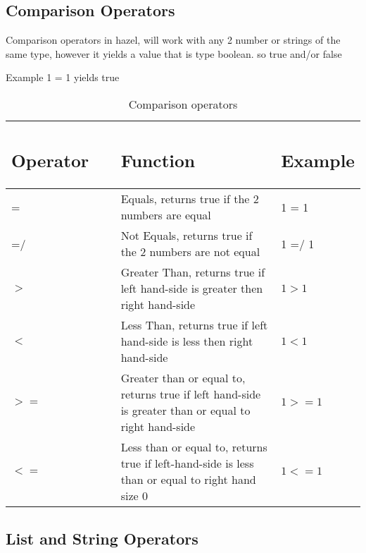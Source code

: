 \documentclass{article}
\begin{document}
\subsection{Comparison Operators}
Comparison operators in hazel, will work with any 2 number or strings of the same type, however it yields
a value that is type boolean. so true and/or false 

Example  1 = 1 yields true 

\begin{table}[H]
    \centering
    \begin{tabular}{p{0.35\linewidth} | p{0.6\linewidth}| p{0.6\linewidth} }
      
\subsection*{Operator} & \subsection*{Function} & \subsection*{Example}
 \\ \hline
      = & Equals, returns true if the 2 numbers are equal & 1 = 1 \\ \hline
      =/ & Not Equals, returns true if the 2 numbers are not equal & 1 =/ 1 \\ \hline
      $>$ & Greater Than, returns true if left hand-side is greater then right hand-side & $1 > 1$ \\ \hline
      $<$ & Less Than, returns true if left hand-side is less then right hand-side  & $1 < 1$ \\ \hline
      $>=$ & Greater than or equal to, returns true if left hand-side is greater than or equal to right hand-side  & $1 >= 1$\\ \hline
      $<=$ & Less than or equal to, returns true if left-hand-side is less than or equal to right hand size 0 & $1 <= 1$ \\ \hline
      
    \end{tabular}
        \caption{Comparison operators}
\end{table}


\subsection{List and String Operators}
\end{document}
